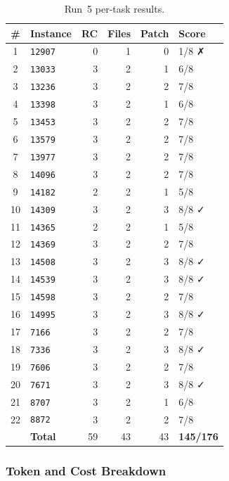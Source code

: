 \begin{table}[h]
\centering
\small
\caption{Run~5 per-task results.}\label{tab:r5-tasks}
\setlength{\tabcolsep}{4pt}
\begin{tabular}{clrrrl}
\toprule
\textbf{\#} & \textbf{Instance} & \textbf{RC} & \textbf{Files} & \textbf{Patch} & \textbf{Score} \\
\midrule
 1 & \texttt{12907} & 0 & 1 & 0 & 1/8 ✗ \\
 2 & \texttt{13033} & 3 & 2 & 1 & 6/8 \\
 3 & \texttt{13236} & 3 & 2 & 2 & 7/8 \\
 4 & \texttt{13398} & 3 & 2 & 1 & 6/8 \\
 5 & \texttt{13453} & 3 & 2 & 2 & 7/8 \\
 6 & \texttt{13579} & 3 & 2 & 2 & 7/8 \\
 7 & \texttt{13977} & 3 & 2 & 2 & 7/8 \\
 8 & \texttt{14096} & 3 & 2 & 2 & 7/8 \\
 9 & \texttt{14182} & 2 & 2 & 1 & 5/8 \\
10 & \texttt{14309} & 3 & 2 & 3 & 8/8 ✓ \\
11 & \texttt{14365} & 2 & 2 & 1 & 5/8 \\
12 & \texttt{14369} & 3 & 2 & 2 & 7/8 \\
13 & \texttt{14508} & 3 & 2 & 3 & 8/8 ✓ \\
14 & \texttt{14539} & 3 & 2 & 3 & 8/8 ✓ \\
15 & \texttt{14598} & 3 & 2 & 2 & 7/8 \\
16 & \texttt{14995} & 3 & 2 & 3 & 8/8 ✓ \\
17 & \texttt{7166}  & 3 & 2 & 2 & 7/8 \\
18 & \texttt{7336}  & 3 & 2 & 3 & 8/8 ✓ \\
19 & \texttt{7606}  & 3 & 2 & 2 & 7/8 \\
20 & \texttt{7671}  & 3 & 2 & 3 & 8/8 ✓ \\
21 & \texttt{8707}  & 3 & 2 & 1 & 6/8 \\
22 & \texttt{8872}  & 3 & 2 & 2 & 7/8 \\
\midrule
   & \textbf{Total} & 59 & 43 & 43 & \textbf{145/176} \\
\bottomrule
\end{tabular}
\end{table}

\subsubsection{Token and Cost Breakdown}


